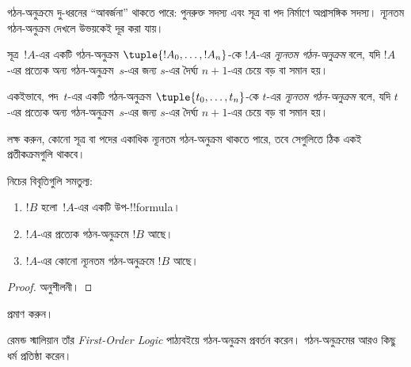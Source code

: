 \documentclass[../../../include/open-logic-section]{subfiles}
\begin{document}
গঠন-অনুক্রমে দু-ধরনের “আবর্জনা” থাকতে পারে: পুনরুক্ত সদস্য এবং সূত্র
বা পদ নির্মাণে অপ্রাসঙ্গিক সদস্য। ন্যূনতম গঠন-অনুক্রম দেখলে উভয়কেই
দূর করা যায়।

\begin{defn}
সূত্র~$!A$-এর একটি গঠন-অনুক্রম $\tuple{!A_0, \ldots, !A_n}$-কে
$!A$-এর \emph{ন্যূনতম গঠন-অনুক্রম} বলে, যদি $!A$-এর প্রত্যেক অন্য
গঠন-অনুক্রম~$s$-এর জন্য $s$-এর দৈর্ঘ্য $n+1$-এর চেয়ে বড় বা সমান হয়।

একইভাবে, পদ~$t$-এর একটি গঠন-অনুক্রম $\tuple{t_0, \ldots, t_n}$-কে
$t$-এর \emph{ন্যূনতম গঠন-অনুক্রম} বলে, যদি $t$-এর প্রত্যেক অন্য
গঠন-অনুক্রম~$s$-এর জন্য $s$-এর দৈর্ঘ্য $n+1$-এর চেয়ে বড় বা সমান হয়।
\end{defn}

লক্ষ করুন, কোনো সূত্র বা পদের একাধিক ন্যূনতম গঠন-অনুক্রম থাকতে পারে,
তবে সেগুলিতে ঠিক একই প্রতীকক্রমগুলি থাকবে।

\begin{prop}
নিচের বিবৃতিগুলি সমতুল্য:
\begin{enumerate}
    \item $!B$ হলো~$!A$-এর একটি উপ-!!{formula}।
    \item $!A$-এর প্রত্যেক গঠন-অনুক্রমে $!B$ আছে।
    \item $!A$-এর কোনো ন্যূনতম গঠন-অনুক্রমে $!B$ আছে।
\end{enumerate}
\end{prop}

\begin{proof}
অনুশীলনী।
\end{proof}

\begin{prob}
 প্রমাণ করুন।
\end{prob}

\begin{history}
রেমন্ড স্মালিয়ান তাঁর \emph{First-Order Logic} পাঠ্যবইয়ে
\citep{Smullyan1968} গঠন-অনুক্রম প্রবর্তন করেন। গঠন-অনুক্রমের আরও কিছু
ধর্ম \citet{Zuckerman1973} প্রতিষ্ঠা করেন।
\end{history}
\end{document}
